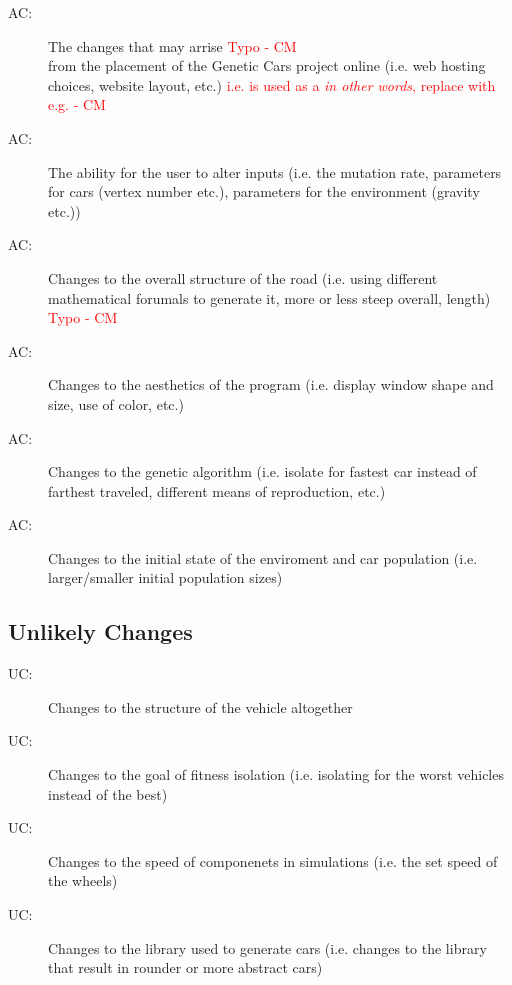 \documentclass[12pt, titlepage]{article}
\newcounter{acnum}
\newcommand{\actheacnum}{AC\theacnum}
\newcounter{ucnum}
\newcommand{\uctheucnum}{UC\theucnum}
\begin{document}
\begin{description}
\item[ \actheacnum \label{acWebsite}:] The changes that 
may arrise \textcolor{red}{Typo - CM} \\ from the placement of the Genetic Cars project online (i.e. web 
hosting choices, website layout, etc.) \textcolor{red}{i.e. is used as a \textit{in other words}, replace with e.g. - CM}
\item[ \actheacnum \label{acUserInput}:] The ability for 
the user to alter inputs (i.e. the mutation rate, parameters for cars (vertex 
number etc.), parameters for the environment (gravity etc.)) 
\item[ \actheacnum \label{acRoad}:] Changes to the overall 
structure of the road (i.e. using different mathematical forumals to generate 
it, more or less steep overall, length) \textcolor{red}{Typo - CM} \\
\item[ \actheacnum \label{acAesthetics}:] Changes to the 
aesthetics of the program (i.e. display window shape and size, use of color, 
etc.)
\item[ \actheacnum \label{acGeneticAlgorithm}:] Changes to 
the genetic algorithm (i.e. isolate for fastest car instead of farthest 
traveled, different means of reproduction, etc.)
\item[ \actheacnum \label{acInitialFactors}:] Changes to 
the initial state of the enviroment and car population (i.e. larger/smaller 
initial population sizes)
\end{description}

\subsection{Unlikely Changes} \label{SecUchange}

\begin{description}
\item[ \uctheucnum \label{ucVehicleChange}:] Changes to 
the structure of the vehicle altogether 
\item[ \uctheucnum \label{ucFitnessRequirements}:] Changes 
to the goal of fitness isolation (i.e. isolating for the worst vehicles instead 
of the best)
\item[ \uctheucnum \label{ucCarSpeed}:] Changes to the 
speed of componenets in simulations (i.e. the set speed of the wheels)
\item[ \uctheucnum \label{ucLibrary}:] Changes to the 
library used to generate cars (i.e. changes to the library that result in 
rounder or more abstract cars)
\end{description}
\end{document}
